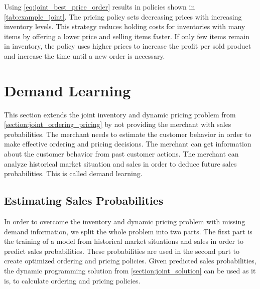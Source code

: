 Using \cref{eq:joint_best_price_order} results in policies shown in \cref{tab:example_joint}.
The pricing policy sets decreasing prices with increasing inventory levels.
This strategy reduces holding costs for inventories with many items by offering a lower price and selling items faster.
If only few items remain in inventory, the policy uses higher prices to increase the profit per sold product and increase the time until a new order is necessary.



\section{Demand Learning}
\label{section:demand_learning}

This section extends the joint inventory and dynamic pricing problem from \cref{section:joint_ordering_pricing} by not providing the merchant with sales probabilities.
The merchant needs to estimate the customer behavior in order to make effective ordering and pricing decisions.
The merchant can get information about the customer behavior from past customer actions.
The merchant can analyze historical market situation and sales in order to deduce future sales probabilities.
This is called demand learning.



\subsection{Estimating Sales Probabilities}
In order to overcome the inventory and dynamic pricing problem with missing demand information, we split the whole problem into two parts.
The first part is the training of a model from historical market situations and sales in order to predict sales probabilities.
These probabilities are used in the second part to create optimized ordering and pricing policies.
Given predicted sales probabilities, the dynamic programming solution from \cref{section:joint_solution} can be used as it is, to calculate ordering and pricing policies.

